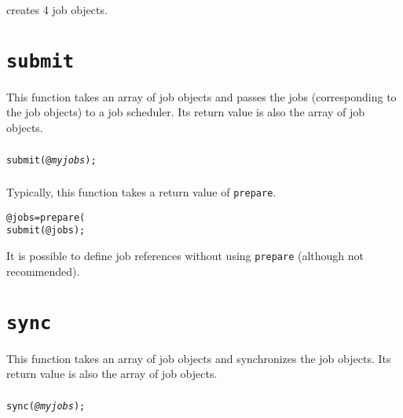 \documentclass[a4paper,10pt]{report}
\begin{document}
creates 4 job objects.

\section{\texttt{submit}}\label{sec:submit}

This function takes an array of job objects and passes the jobs
(corresponding to the job objects) to a job scheduler.  Its return
value is also the array of job objects.

\subsubsection{\format}
\begin{boxnote}
\begin{alltt}
submit(@\textit{myjobs});
\end{alltt}
\end{boxnote}
\vspace{\baselineskip}

\subsubsection{\example}
Typically, this function takes a return value of \texttt{prepare}.
\begin{boxnote}
\begin{alltt}
@jobs = prepare(%mytemplate);
submit(@jobs);
\end{alltt}
\end{boxnote}
\vspace{\baselineskip}
It is possible to define job references without using
\texttt{prepare} (although not recommended).

\section{\texttt{sync}}

This function takes an array of job objects and synchronizes the job objects.
Its return value is also the array of job objects.

\subsubsection{\format}

\begin{boxnote}
\begin{alltt}
sync(\textit{@myjobs});
\end{alltt}
\end{boxnote}
\vspace{\baselineskip}
\end{document}
